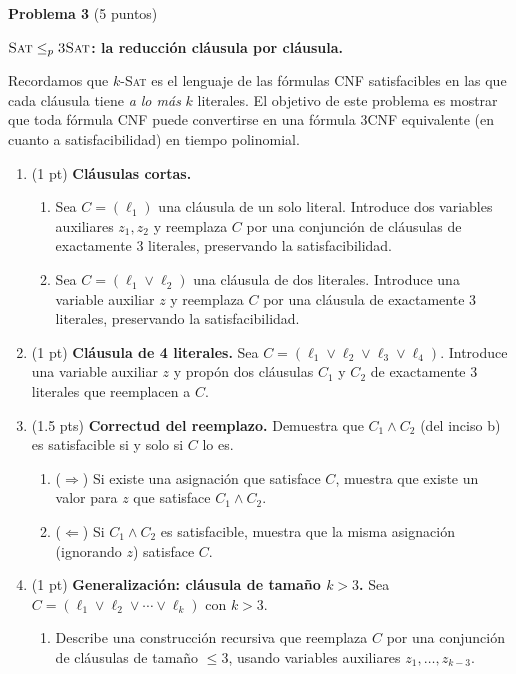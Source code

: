\documentclass[12pt, letterpaper]{article}
\newcommand{\SAT}{\textsc{Sat}}
\newcommand{\tSAT}{\textsc{3Sat}}
\newcommand{\problema}[2]{%
  \bigskip
  \noindent\textbf{Problema #1} \textnormal{(#2 puntos)}\par\smallskip
}
\begin{document}
\problema{3}{5} \textbf{$\SAT \leq_p \tSAT$: la reducción cláusula por
cláusula.}

Recordamos que $k$-\SAT{} es el lenguaje de las fórmulas CNF satisfacibles en
las que cada cláusula tiene \emph{a lo más} $k$ literales.  El objetivo de este
problema es mostrar que toda fórmula CNF puede convertirse en una fórmula 3CNF
equivalente (en cuanto a satisfacibilidad) en tiempo polinomial.

\begin{enumerate}[label=\alph*)]

\item (1 pt) \textbf{Cláusulas cortas.}
  \begin{enumerate}[label=\roman*.]
    \item Sea $C = (\ell_1)$ una cláusula de un solo literal.  Introduce dos
      variables auxiliares $z_1, z_2$ y reemplaza $C$ por una conjunción de
      cláusulas de exactamente 3 literales, preservando la satisfacibilidad.
    \item Sea $C = (\ell_1 \vee \ell_2)$ una cláusula de dos literales.
      Introduce una variable auxiliar $z$ y reemplaza $C$ por una cláusula de
      exactamente 3 literales, preservando la satisfacibilidad.
  \end{enumerate}

\item (1 pt) \textbf{Cláusula de 4 literales.}
  Sea $C = (\ell_1 \vee \ell_2 \vee \ell_3 \vee \ell_4)$.  Introduce una
  variable auxiliar $z$ y propón dos cláusulas $C_1$ y $C_2$ de exactamente 3
  literales que reemplacen a $C$.

\item (1.5 pts) \textbf{Correctud del reemplazo.}
  Demuestra que $C_1 \wedge C_2$ (del inciso b) es satisfacible si y solo si
  $C$ lo es.
  \begin{enumerate}[label=\roman*.]
    \item ($\Rightarrow$) Si existe una asignación que satisface $C$, muestra
      que existe un valor para $z$ que satisface $C_1 \wedge C_2$.
    \item ($\Leftarrow$) Si $C_1 \wedge C_2$ es satisfacible, muestra que
      la misma asignación (ignorando $z$) satisface $C$.
  \end{enumerate}

\item (1 pt) \textbf{Generalización: cláusula de tamaño $k > 3$.}
  Sea $C = (\ell_1 \vee \ell_2 \vee \cdots \vee \ell_k)$ con $k > 3$.
  \begin{enumerate}[label=\roman*.]
    \item Describe una construcción recursiva que reemplaza $C$ por una
      conjunción de cláusulas de tamaño $\leq 3$, usando variables auxiliares
      $z_1, \ldots, z_{k-3}$.


\end{enumerate}
\end{enumerate}
\end{document}
